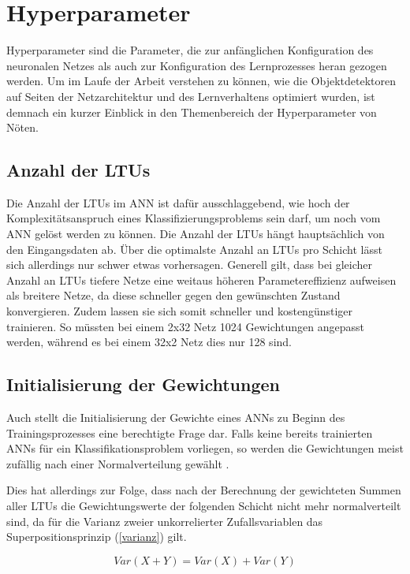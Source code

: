 \section{Hyperparameter}


Hyperparameter sind die Parameter, die zur anfänglichen Konfiguration des neuronalen Netzes als auch zur Konfiguration des Lernprozesses heran gezogen werden. Um im Laufe der Arbeit verstehen zu können, wie die Objektdetektoren auf Seiten der Netzarchitektur und des Lernverhaltens optimiert wurden, ist demnach ein kurzer Einblick in den Themenbereich der Hyperparameter von Nöten.

\subsection*{Anzahl der LTUs}
Die Anzahl der LTUs im ANN ist dafür ausschlaggebend, wie hoch der Komplexitätsanspruch eines Klassifizierungsproblems sein darf, um noch vom ANN gelöst werden zu können. Die Anzahl der LTUs hängt hauptsächlich von den Eingangsdaten ab. Über die optimalste Anzahl an LTUs pro Schicht lässt sich allerdings nur schwer etwas vorhersagen. Generell gilt, dass bei gleicher Anzahl an LTUs tiefere Netze eine weitaus höheren Parametereffizienz aufweisen als breitere Netze, da diese schneller gegen den gewünschten Zustand konvergieren. Zudem lassen sie sich somit schneller und kostengünstiger trainieren. So müssten bei einem 2x32 Netz 1024 Gewichtungen angepasst werden, während es bei einem 32x2 Netz dies nur 128 sind.  \cite{AurelienGeron.2018}

\subsection*{Initialisierung der Gewichtungen}
Auch stellt die Initialisierung der Gewichte eines ANNs zu Beginn des Trainingsprozesses eine berechtigte Frage dar. Falls keine bereits trainierten ANNs für ein Klassifikationsproblem vorliegen, so werden die Gewichtungen meist zufällig nach einer Normalverteilung gewählt \cite{AurelienGeron.2018}. 

Dies hat allerdings zur Folge, dass nach der Berechnung der gewichteten Summen aller LTUs die Gewichtungswerte der folgenden Schicht nicht mehr normalverteilt sind, da für die Varianz zweier unkorrelierter Zufallsvariablen das Superpositionsprinzip (\ref{varianz}) gilt.

\begin{equation} \label{varianz}
Var(X + Y) = Var(X) + Var(Y)
\end{equation}

